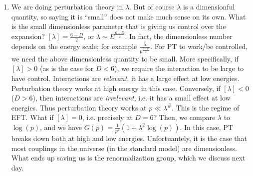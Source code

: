 \begin{enumerate}
    \item We are doing perturbation theory in $\lambda$. But of course $\lambda$ is a dimensionful quantity, so saying it is ``small'' does not make much sense on its own. What is the small dimensionless parameter that is giving us control over the expansion? $[\lambda] = \frac{6-D}{2}$, or $\lambda \sim E^{\frac{6-D}{2}}$. In fact, the dimensionless number depends on the energy scale; for example $\frac{\lambda}{p^{\frac{6-D}{2}}}$. For PT to work/be controlled, we need the above dimensionless quantity to be small. More specifically, if $[\lambda] > 0$ (as is the case for $D < 6$), we require the interaction to be large to have control. 
    Interactions are \emph{relevant}, it has a large effect at low energies. Perturbation theory works at high energy in this case. Conversely, if $[\lambda] < 0$ ($D > 6$), then interactions are \emph{irrelevant}, i.e. it has a small effect at low energies. Thus perturbation theory works at $p \ll \lambda^{\#}$. This is the regime of EFT. What if $[\lambda] = 0$, i.e. precisely at $D = 6$? Then, we compare $\lambda$ to $\log(p)$, and we have $G(p) = \frac{1}{p^2}(1 + \lambda^2 \log(p))$. In this case, PT breaks down both at high and low energies. Unfortuantely, it is the case that most couplings in the universe (in the standard model) are dimensionless. What ends up saving us is the renormalization group, which we discuss next day.
\end{enumerate}